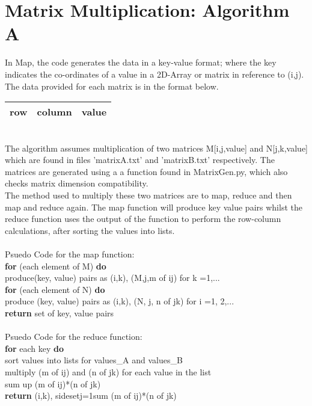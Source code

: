 \documentclass[10pt,a4paper]{article}
\begin{document}
\section{Matrix Multiplication: Algorithm A}
\noindent In Map, the code generates the data in a key-value format; where the key indicates the co-ordinates of a value in a 2D-Array or matrix in reference to (i,j).\\
The data provided for each matrix is in the format below.
\begin{tabular}{|c|c|c|}
\hline  
row & column & value\\  
\hline 
\end{tabular}
\\
\noindent The algorithm assumes multiplication of two matrices M[i,j,value] and N[j,k,value] which are found in files 'matrixA.txt' and 'matrixB.txt' respectively. The matrices are generated using a a function found in MatrixGen.py, which also checks matrix dimension compatibility. \\
\noindent The method used to multiply these two matrices are to map, reduce and then map and reduce again. The map function will produce key value pairs whilst the reduce function uses the output of the function to perform the row-column calculations, after sorting the values into lists.\\
\\
\noindent Psuedo Code for the map function:\\
\noindent \textbf{for} (each element of M) \textbf{do}\\
\indent produce(key, value) pairs as (i,k), (M,j,m of ij) for k =1,...\\
\noindent \textbf{for} (each element of N) \textbf{do}\\
\indent produce (key, value) pairs as (i,k), (N, j, n of jk) for i =1, 2,...\\
\noindent \textbf{return} set of key, value pairs\\
\\
Psuedo Code for the reduce function:\\
\noindent \textbf{for} each key \textbf{do}\\
\indent sort values into lists for values\_A and values\_B\\
\indent multiply (m of ij) and (n of jk) for each value in the list\\
\indent sum up (m of ij)*(n of jk)\\
\noindent \textbf{return} (i,k), sideset{}{j=1}sum (m of ij)*(n of jk)
\end{document}
